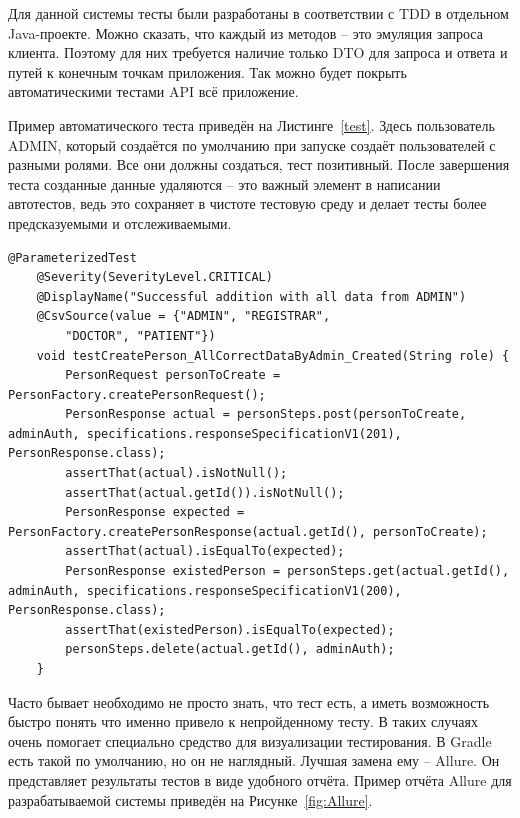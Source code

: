 \documentclass[a4paper,article]{article}
\begin{document}
    Для данной системы тесты были разработаны в соответствии с TDD в отдельном Java-проекте. Можно сказать, что каждый из методов -- это эмуляция запроса клиента. Поэтому для них требуется наличие только DTO для запроса и ответа и путей к конечным точкам приложения. Так можно будет покрыть автоматическими тестами API всё приложение.
    
    Пример автоматического теста приведён на Листинге~\ref{test}. Здесь пользователь ADMIN, который создаётся по умолчанию при запуске создаёт пользователей с разными ролями. Все они должны создаться, тест позитивный. После завершения теста созданные данные удаляются -- это важный элемент в написании автотестов, ведь это сохраняет в чистоте тестовую среду и делает тесты более предсказуемыми и отслеживаемыми.
    
    \begin{lstlisting}[label=test,caption=Пример автотеста для разработанной системы]
    @ParameterizedTest
    @Severity(SeverityLevel.CRITICAL)
    @DisplayName("Successful addition with all data from ADMIN")
    @CsvSource(value = {"ADMIN", "REGISTRAR",
    	"DOCTOR", "PATIENT"})
    void testCreatePerson_AllCorrectDataByAdmin_Created(String role) {
        PersonRequest personToCreate = PersonFactory.createPersonRequest();
        PersonResponse actual = personSteps.post(personToCreate, adminAuth, specifications.responseSpecificationV1(201), PersonResponse.class);
        assertThat(actual).isNotNull();
        assertThat(actual.getId()).isNotNull();
        PersonResponse expected = PersonFactory.createPersonResponse(actual.getId(), personToCreate);
        assertThat(actual).isEqualTo(expected);
        PersonResponse existedPerson = personSteps.get(actual.getId(), adminAuth, specifications.responseSpecificationV1(200), PersonResponse.class);
        assertThat(existedPerson).isEqualTo(expected);
        personSteps.delete(actual.getId(), adminAuth);
    }
    \end{lstlisting}
    
    Часто бывает необходимо не просто знать, что тест есть, а иметь возможность быстро понять что именно привело к непройденному тесту. В таких случаях очень помогает специально средство для визуализации тестирования. В Gradle есть такой по умолчанию, но он не наглядный. Лучшая замена ему -- Allure. Он представляет результаты тестов в виде удобного отчёта. Пример отчёта Allure для разрабатываемой системы приведён на Рисунке~\ref{fig:Allure}.
    
\end{document}

